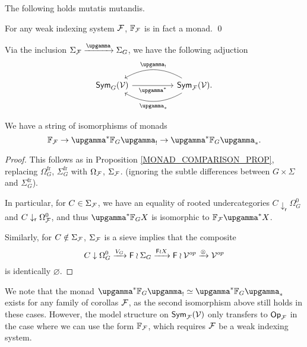 \documentclass[a4paper,10pt]{article}%
\begin{document}
The following holds mutatis mutandis.
\begin{corollary}
        For any weak indexing system $\mathcal F$, $\mathbb F_{\mathcal F}$ is in fact a monad. \qed
\end{corollary}

Via the inclusion $\Sigma_\F \xrightarrow{\upgamma} \Sigma_G$, we have the following adjuction
\[
\begin{tikzcd}[column sep =5em]
        \mathsf{Sym}_G(\mathcal{V})
        \ar{r}[swap]{\upgamma^{\**}} 
        &
        \mathsf{Sym}_\F(\mathcal{V}) 
        \ar[bend right]{l}[swap,midway]{\upgamma_{!}}
        \ar[bend left]{l}{\upgamma_{\**}}.
\end{tikzcd}
\]

\begin{lemma}
        We have a string of isomorphisms of monads
        \[
        \mathbb F_\F \to \upgamma^{\**} \mathbb F_G \upgamma_! \to \upgamma^{\**} \mathbb F_G \upgamma_{\**}.
        \]
\end{lemma}
\begin{proof}
        This follows as in Proposition \ref{MONAD_COMPARISON_PROP}, replacing $\Omega_G^{\text{fr}}$, $\Sigma_G^{\text{fr}}$ with $\Omega_{\mathcal F}$, $\Sigma_{\mathcal F}$.
        (ignoring the subtle differences between $G \times \Sigma$ and $\Sigma_G^{\text{fr}}$).
        
        In particular, for $C\in \Sigma_{\mathcal F}$, we have an equality of rooted undercategories $C \downarrow_{\mathsf r} \Omega_G^0$ and $C \downarrow_{\mathsf r} \Omega_{\mathcal F}^0$, and thus $\upgamma^{\**} \mathbb F_G X$ is isomorphic to $\mathbb F_\F \upgamma^{\**} X$. 

        Similarly, for $C \notin \Sigma_{\mathcal F}$, $\Sigma_{\mathcal F}$ is a sieve implies that the composite
        \[
        C\downarrow \Omega_G^0 \xrightarrow{V_G} \mathsf{F}\wr \Sigma_G \xrightarrow{\mathsf{F} \wr X} \mathsf{F} \wr \mathcal V^{op} \xrightarrow{\otimes} \mathcal V^{op}
        \]
        is identically $\varnothing$. 
\end{proof}

\begin{remark}
        We note that the monad $\upgamma^{\**} \mathbb F_G \upgamma_! \simeq \upgamma^{\**} \mathbb F_G \upgamma_{\**}$ exists for any family of corollas $\mathcal F$, as the second isomorphism above still holds in these cases. 
        However, the model structure on $\mathsf{Sym}_{\mathcal F}(\mathcal V)$ only transfers to $\mathsf{Op}_{\mathcal F}$ in the case where we can use the form $\mathbb F_{\mathcal F}$, which requires $\mathcal F$ be a weak indexing system.
\end{remark}
\end{document}

